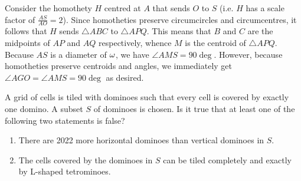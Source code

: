 \begin{solution*}
    Consider the homothety $H$ centred at $A$ that sends $O$ to $S$ (i.e. $H$ has a scale factor of $\frac{AS}{AO} = 2$). Since homotheties preserve circumcircles and circumcentres, it follows that $H$ sends $\triangle ABC$ to $\triangle APQ$. This means that $B$ and $C$ are the midpoints of $AP$ and $AQ$ respectively, whence $M$ is the centroid of $\triangle APQ$. Because $AS$ is a diameter of $\omega$, we have $\angle AMS = 90\deg$. However, because homotheties preserve centroids and angles, we immediately get $\angle AGO = \angle AMS = 90\deg$ as desired.
\end{solution*}

\begin{question}[Yes]\label{A::2023-O-2-2}
    A grid of cells is tiled with dominoes such that every cell is covered by exactly one domino. A subset $S$ of dominoes is chosen. Is it true that at least one of the following two statements is false?
    \begin{enumerate}
        \item There are 2022 more horizontal dominoes than vertical dominoes in $S$.
        \item The cells covered by the dominoes in $S$ can be tiled completely and exactly by L-shaped tetrominoes.
    \end{enumerate}
\end{question}
